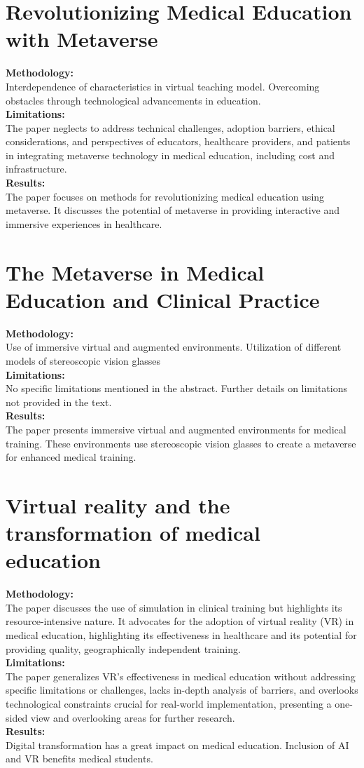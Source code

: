 \section{Revolutionizing Medical Education with Metaverse
	\cite{baskar2022revolutionizing}\cite{JournalArticle9}}
\textbf{Methodology:}\\Interdependence of characteristics in virtual teaching model.
Overcoming obstacles through technological advancements in education.\\
\textbf{Limitations:}\\The paper neglects to address technical challenges, adoption barriers, ethical considerations, and perspectives of educators, healthcare providers, and patients in integrating metaverse technology in medical education, including cost and infrastructure.\\
\textbf{Results:}\\ The paper focuses on methods for revolutionizing medical education using metaverse. It discusses the potential of metaverse in providing interactive and immersive experiences in healthcare.
\section{The Metaverse in Medical Education and Clinical Practice
	\cite{juan2023metaverse}}
\textbf{Methodology:}\\Use of immersive virtual and augmented environments.
Utilization of different models of stereoscopic vision glasses\\
\textbf{Limitations:}\\No specific limitations mentioned in the abstract. Further details on limitations not provided in the text.\\
\textbf{Results:}\\The paper presents immersive virtual and augmented environments for medical training. These environments use stereoscopic vision glasses to create a metaverse for enhanced medical training.
\section{Virtual reality and the transformation of medical education
	\cite{pottle2019virtual}}
\textbf{Methodology:}\\The paper discusses the use of simulation in clinical training but highlights its resource-intensive nature. It advocates for the adoption of virtual reality (VR) in medical education, highlighting its effectiveness in healthcare and its potential for providing quality, geographically independent training.\\
\textbf{Limitations:}\\
The paper generalizes VR's effectiveness in medical education without addressing specific limitations or challenges, lacks in-depth analysis of barriers, and overlooks technological constraints crucial for real-world implementation, presenting a one-sided view and overlooking areas for further research.\\
\textbf{Results:}\\Digital transformation has a great impact on medical education.
Inclusion of AI and VR benefits medical students.
